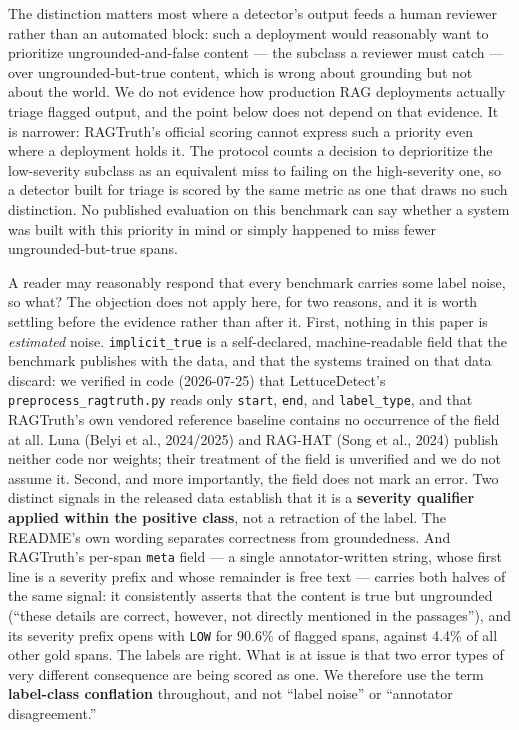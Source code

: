 \documentclass[11pt]{article}
\begin{document}
The distinction matters most where a detector's output feeds a human reviewer rather than
an automated block: such a deployment would reasonably want to prioritize
ungrounded-and-false content --- the subclass a reviewer must catch --- over
ungrounded-but-true content, which is wrong about grounding but not about the world. We do
not evidence how production RAG deployments actually triage flagged output, and the point
below does not depend on that evidence. It is narrower: RAGTruth's official scoring cannot
express such a priority even where a deployment holds it. The protocol counts a decision to
deprioritize the low-severity subclass as an equivalent miss to failing on the high-severity
one, so a detector built for triage is scored by the same metric as one that draws no such
distinction. No published evaluation on this benchmark can say whether a system was built
with this priority in mind or simply happened to miss fewer ungrounded-but-true spans.

A reader may reasonably respond that every benchmark carries some label noise, so what? The
objection does not apply here, for two reasons, and it is worth settling before the evidence
rather than after it. First, nothing in this paper is \emph{estimated} noise. \texttt{implicit\_true} is
a self-declared, machine-readable field that the benchmark publishes with the data, and that
the systems trained on that data discard: we verified in code (2026-07-25) that
LettuceDetect's \texttt{preprocess\_ragtruth.py} reads only \texttt{start}, \texttt{end}, and \texttt{label\_type}, and
that RAGTruth's own vendored reference baseline contains no occurrence of the field at all.
Luna (Belyi et al., 2024/2025) and RAG-HAT (Song et al., 2024) publish neither code nor
weights; their treatment of the field is unverified and we do not assume it. Second, and
more importantly, the field does not mark an error. Two distinct signals in the released
data establish that it is a \textbf{severity qualifier applied within the positive class}, not a
retraction of the
label. The README's own wording separates correctness from groundedness. And RAGTruth's
per-span \texttt{meta} field --- a single annotator-written string, whose first line is a severity
prefix and whose remainder is free text --- carries both halves of the same signal: it
consistently asserts that the content is true but ungrounded (``these details are correct,
however, not directly mentioned in the passages''), and its severity prefix opens with \texttt{LOW}
for 90.6\% of flagged spans, against 4.4\% of all other gold spans. The labels are right. What
is at issue is that two error types of very different consequence are being scored as one.
We therefore use the term \textbf{label-class conflation} throughout, and not ``label noise'' or
``annotator disagreement.''
\end{document}

